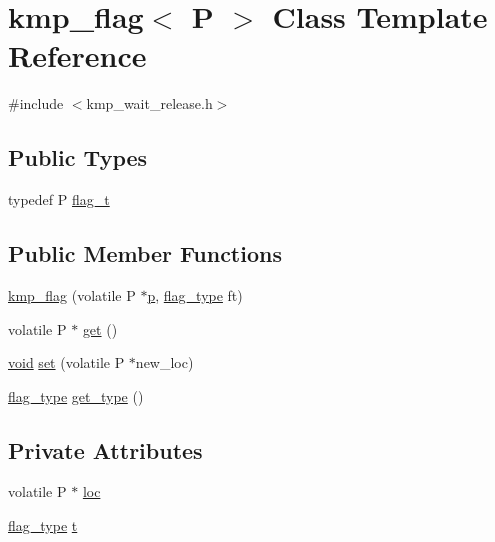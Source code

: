 \hypertarget{classkmp__flag}{\section{kmp\-\_\-flag$<$ P $>$ Class Template Reference}
\label{classkmp__flag}
}


{\ttfamily \#include $<$kmp\-\_\-wait\-\_\-release.\-h$>$}

\subsection*{Public Types}
\begin{DoxyCompactItemize}
\item 
typedef P \hyperlink{classkmp__flag_ab4d1e88823cea9a739c44d7b7f3956fd}{flag\-\_\-t}
\end{DoxyCompactItemize}
\subsection*{Public Member Functions}
\begin{DoxyCompactItemize}
\item 
\hyperlink{classkmp__flag_aed9c6ebdd900936d687c617632e25b7b}{kmp\-\_\-flag} (volatile P $\ast$\hyperlink{ittnotify__static_8h_ab7caea589d3ca96f9f11c78f10bff578}{p}, \hyperlink{group__WAIT__RELEASE_ga507a7197646f995b5529a68c1481e39b}{flag\-\_\-type} ft)
\item 
volatile P $\ast$ \hyperlink{classkmp__flag_af653ec27d16d63dab994e52ac6713aed}{get} ()
\item 
\hyperlink{ittnotify__static_8h_af941d56e55e3c5465135b60c4d6343ed}{void} \hyperlink{classkmp__flag_a61a56555c28015b8f0df8b9c33fea599}{set} (volatile P $\ast$new\-\_\-loc)
\item 
\hyperlink{group__WAIT__RELEASE_ga507a7197646f995b5529a68c1481e39b}{flag\-\_\-type} \hyperlink{classkmp__flag_a36961b6d49f84ab81365a9389613ea34}{get\-\_\-type} ()
\end{DoxyCompactItemize}
\subsection*{Private Attributes}
\begin{DoxyCompactItemize}
\item 
volatile P $\ast$ \hyperlink{classkmp__flag_a5d89de3bda829ab9be324007d915aa3b}{loc}
\item 
\hyperlink{group__WAIT__RELEASE_ga507a7197646f995b5529a68c1481e39b}{flag\-\_\-type} \hyperlink{classkmp__flag_aebad8727c9520d1bb2b2219c94cb3c62}{t}
\end{DoxyCompactItemize}


